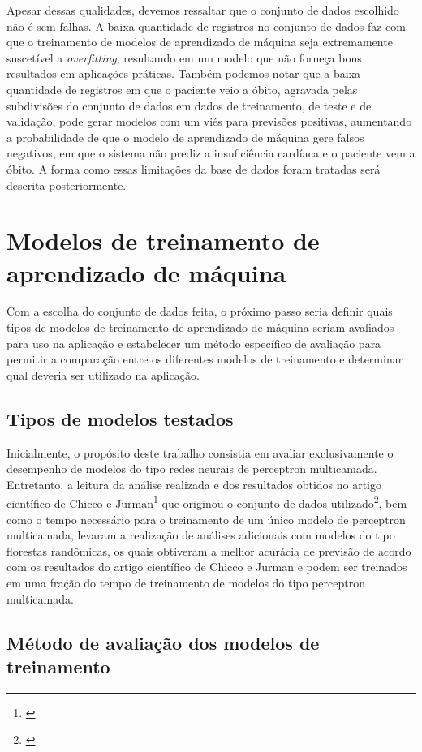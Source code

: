 Apesar dessas qualidades, devemos ressaltar que o conjunto de dados escolhido não é sem falhas. A baixa quantidade de registros no conjunto de dados faz com que o treinamento de modelos de aprendizado de máquina seja extremamente suscetível a \textit{overfitting}, resultando em um modelo que não forneça bons resultados em aplicações práticas. Também podemos notar que a baixa quantidade de registros em que o paciente veio a óbito, agravada pelas subdivisões do conjunto de dados em dados de treinamento, de teste e de validação, pode gerar modelos com um viés para previsões positivas, aumentando a probabilidade de que o modelo de aprendizado de máquina gere falsos negativos, em que o sistema não prediz a insuficiência cardíaca e o paciente vem a óbito. A forma como essas limitações da base de dados foram tratadas será descrita posteriormente.

\section{Modelos de treinamento de aprendizado de máquina}

Com a escolha do conjunto de dados feita, o próximo passo seria definir quais tipos de modelos de treinamento de aprendizado de máquina seriam avaliados para uso na aplicação e estabelecer um método específico de avaliação para permitir a comparação entre os diferentes modelos de treinamento e determinar qual deveria ser utilizado na aplicação.

\subsection{Tipos de modelos testados}

Inicialmente, o propósito deste trabalho consistia em avaliar exclusivamente o desempenho de modelos do tipo redes neurais de perceptron multicamada. Entretanto, a leitura da análise realizada e dos resultados obtidos no artigo científico de Chicco e Jurman\footnote{\cite{chicco2020}} que originou o conjunto de dados utilizado\footnote{\cite{larxel_dataset}}, bem como o tempo necessário para o treinamento de um único modelo de perceptron multicamada, levaram a realização de análises adicionais com modelos do tipo florestas randômicas, os quais obtiveram a melhor acurácia de previsão de acordo com os resultados do artigo científico de Chicco e Jurman e podem ser treinados em uma fração do tempo de treinamento de modelos do tipo perceptron multicamada.

\subsection{Método de avaliação dos modelos de treinamento}

